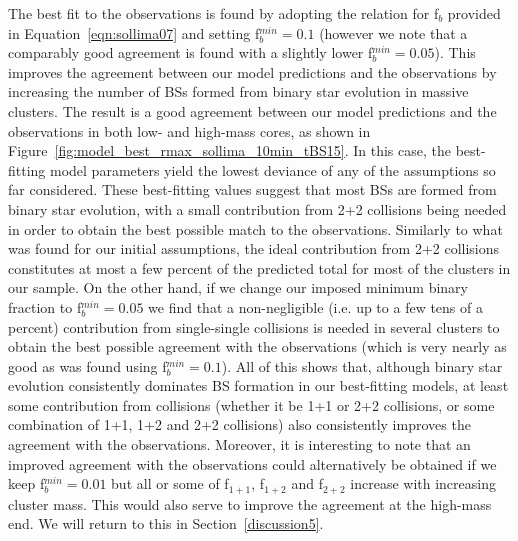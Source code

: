 The best fit to the observations is found
by adopting the relation for f$_b$ provided in
Equation~\ref{eqn:sollima07} and setting f$_b^{min} = 0.1$ (however we
note that a comparably good agreement is found with a slightly lower
f$_b^{min} = 0.05$).  This
improves the agreement between our model predictions and the
observations by increasing the number of BSs formed from binary star
evolution in massive clusters.  The result is a good agreement between
our model predictions and the observations in both low- and high-mass
cores, as shown in
Figure~\ref{fig:model_best_rmax_sollima_10min_tBS15}.  In this case,
the best-fitting model parameters yield the lowest deviance of any of
the assumptions so far considered.  
These best-fitting values suggest that most BSs are formed 
from binary star evolution, with a small contribution from 2+2
collisions being needed in order to obtain the best possible match to
the observations.  Similarly to what was found for our initial
assumptions, the ideal contribution from 2+2 collisions
constitutes at most a few percent of the predicted total for most of
the clusters in our sample.  
On the other hand, if we change our imposed minimum binary fraction to
f$_b^{min} = 0.05$ we find that a non-negligible (i.e. up to a few
tens of a percent) contribution from
single-single collisions is needed in several clusters to obtain the best possible
agreement with the observations (which is very nearly as good as was
found using f$_b^{min} = 0.1$).  All of this shows that, although
binary star evolution consistently dominates BS formation in our
best-fitting models, at least some contribution from collisions
(whether it be 1+1 or 2+2 collisions, or some combination of 1+1, 1+2
and 2+2 collisions) also
consistently improves the agreement with the observations.  Moreover,
it is interesting to note that an improved agreement with the
observations could alternatively be obtained if we keep f$_b^{min} =
0.01$ but all or some of
f$_{1+1}$, f$_{1+2}$ and f$_{2+2}$ increase with increasing cluster
mass.  This would also serve to improve the agreement at the high-mass
end.  We will return to this in Section~\ref{discussion5}.

